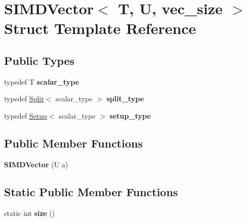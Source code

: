 \hypertarget{struct_s_i_m_d_vector}{}\section{S\+I\+M\+D\+Vector$<$ T, U, vec\+\_\+size $>$ Struct Template Reference}
\label{struct_s_i_m_d_vector}
\subsection*{Public Types}
\begin{DoxyCompactItemize}
\item 
\mbox{\label{struct_s_i_m_d_vector_a9fe76390b41079994522ca1916a6e2bd}} 
typedef T {\bfseries scalar\+\_\+type}
\item 
\mbox{\label{struct_s_i_m_d_vector_a350009d76722c47c71cd6e0017599bff}} 
typedef \hyperlink{struct_split}{Split}$<$ scalar\+\_\+type $>$ {\bfseries split\+\_\+type}
\item 
\mbox{\label{struct_s_i_m_d_vector_a3fd8bd4ce704974f8bcd01703f1553bc}} 
typedef \hyperlink{struct_setup}{Setup}$<$ scalar\+\_\+type $>$ {\bfseries setup\+\_\+type}
\end{DoxyCompactItemize}
\subsection*{Public Member Functions}
\begin{DoxyCompactItemize}
\item 
\mbox{\label{struct_s_i_m_d_vector_a3a3ddaec052be661a818a1e389325562}} 
{\bfseries S\+I\+M\+D\+Vector} (U a)
\end{DoxyCompactItemize}
\subsection*{Static Public Member Functions}
\begin{DoxyCompactItemize}
\item 
\mbox{\label{struct_s_i_m_d_vector_ac84cc4cababbada2051a04a795d69975}} 
static int {\bfseries size} ()
\end{DoxyCompactItemize}
